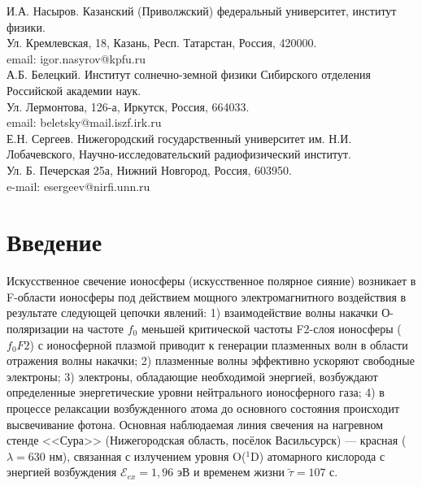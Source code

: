 \documentclass[12pt,a4paper]{article}
\begin{document}
И.А. Насыров. Казанский (Приволжский) федеральный университет, институт физики.\\
Ул. Кремлевская, 18, Казань, Респ. Татарстан, Россия, 420000.\\
email: igor.nasyrov@kpfu.ru\\

А.Б. Белецкий. Институт солнечно-земной физики Сибирского отделения Российской академии наук.\\
Ул. Лермонтова, 126-а, Иркутск, Россия, 664033.\\
email: beletsky@mail.iszf.irk.ru\\

Е.Н. Сергеев. Нижегородский государственный университет им. Н.И. Лобачевского,
Научно-исследовательский радиофизический институт.\\
Ул. Б. Печерская 25а, Нижний Новгород, Россия, 603950.\\
e-mail: esergeev@nirfi.unn.ru\\

\section{Введение}
\label{sec:intro}

Искусственное свечение ионосферы (искусственное полярное сияние) возникает в F-области ионосферы под действием мощного электромагнитного воздействия в результате следующей цепочки явлений: 1) взаимодействие волны накачки О-поляризации на частоте $f_0$ меньшей критической частоты F2-слоя ионосферы ($f_{0}F2$) с ионосферной плазмой приводит к генерации плазменных волн в области отражения волны накачки; 2) плазменные волны эффективно ускоряют свободные электроны; 3) электроны, обладающие необходимой энергией, возбуждают определенные энергетические уровни нейтрального ионосферного газа; 4) в процессе релаксации возбужденного атома до основного состояния происходит высвечивание фотона. Основная наблюдаемая линия свечения на нагревном стенде <<Сура>> (Нижегородская область, посёлок Васильсурск) --- красная ($\lambda = 630$ нм), связанная с излучением уровня O($^1$D) атомарного кислорода с энергией возбуждения $\mathcal{E}_{ex} = 1,96$ эВ и временем жизни $\widetilde{\tau} = 107$ с.
\end{document}
